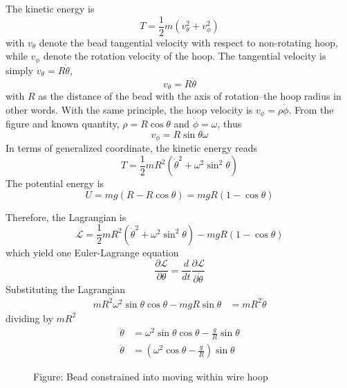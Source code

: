 \documentclass[../../../main.tex]{subfiles}
\begin{document}
The kinetic energy is 
\begin{equation*}
    T=\frac{1}{2}m\left(v_\theta^2+v_\phi^2\right)
\end{equation*}
with $v_{\theta}$ denote the bead tangential velocity with respect to non-rotating hoop, while $v_{\phi}$ denote the rotation velocity of the hoop.
The tangential velocity is simply $v_\theta=R\dot{\theta}$, 
\begin{equation*}
    v_\theta=R\dot{\theta}
\end{equation*}with $R$ as the distance of the bead with the axis of rotation--the hoop radius in other words.
With the same principle, the hoop velocity is $v_\phi=\rho \dot{\phi}$.
From the figure and known quantity, $\rho=R\cos\theta$ and $\dot{\phi}=\omega$, thus 
\begin{equation*}
    v_\phi=R\sin\theta \omega
\end{equation*}
In terms of generalized coordinate, the kinetic energy reads
\begin{equation*}
    T=\frac{1}{2}mR^2\left(\dot{\theta}^2+\omega^2\sin^2\theta\right)
\end{equation*}
The potential energy is
\begin{equation*}
    U=mg(R-R\cos\theta)=mgR(1-\cos\theta)
\end{equation*}

Therefore, the Lagrangian is
\begin{equation*}
    \mathcal{L}=\frac{1}{2}mR^2\left(\dot{\theta}^2+\omega^2\sin^2\theta\right)-mgR(1-\cos\theta)
\end{equation*}
which yield one Euler-Lagrange equation
\begin{equation*}
    \frac{\partial\mathcal{L}}{\partial \theta}=\frac{d}{dt}\frac{\partial \mathcal{L}}{\partial \dot{\theta}}
\end{equation*}
Substituting the Lagrangian
\begin{align*}
    mR^2\omega^2\sin\theta\cos\theta-mgR\sin\theta&=mR^2\ddot{\theta}
\end{align*}
dividing by $mR^2$
\begin{align*}
    \ddot{\theta}&=\omega^2\sin\theta\cos\theta-\frac{g}{R}\sin\theta\\
    \ddot{\theta}&=\left(\omega^2\cos\theta-\frac{g}{R}\right)\sin\theta
\end{align*}
\begin{figure*}
	\centering
	\caption*{Figure: Bead constrained into moving within wire hoop}
\end{figure*}
\end{document}
